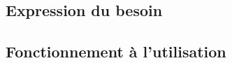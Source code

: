 \subsection{Expression du besoin}\label{besoin-patch}
%
%		
%		
%
\subsection{Fonctionnement à l'utilisation}\label{usePatch}
%
%
